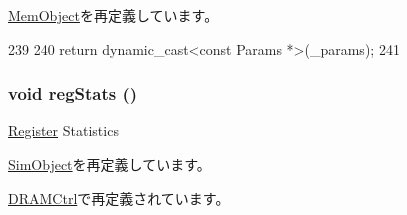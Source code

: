 \hyperlink{classMemObject_acd3c3feb78ae7a8f88fe0f110a718dff}{MemObject}を再定義しています。


\begin{DoxyCode}
239     {
240         return dynamic_cast<const Params *>(_params);
241     }
\end{DoxyCode}
\hypertarget{classAbstractMemory_a4dc637449366fcdfc4e764cdf12d9b11}{
\subsubsection[{regStats}]{\setlength{\rightskip}{0pt plus 5cm}void regStats ()}}
\label{classAbstractMemory_a4dc637449366fcdfc4e764cdf12d9b11}
\hyperlink{classRegister}{Register} Statistics 

\hyperlink{classSimObject_a4dc637449366fcdfc4e764cdf12d9b11}{SimObject}を再定義しています。

\hyperlink{classDRAMCtrl_a4dc637449366fcdfc4e764cdf12d9b11}{DRAMCtrl}で再定義されています。


